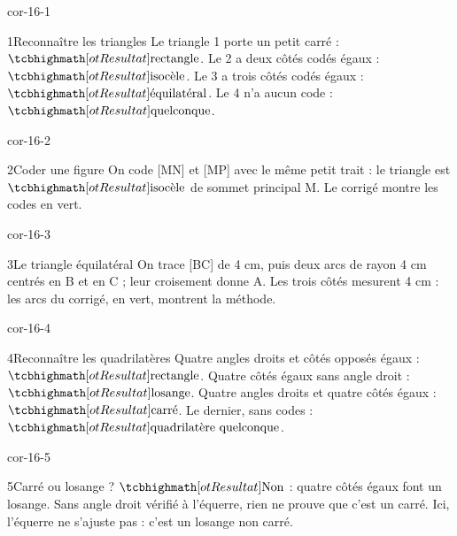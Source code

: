 \clearpage\pagestyle{otMain}\setlength{\otBlocEspacement}{2.5mm}\fontsize{11}{15}\selectfont{}
\begin{blocLivre}{cor-16-1}\begin{corrige}{1}{Reconnaître les triangles}
Le triangle 1 porte un petit carré : $\res{\text{rectangle}}$. Le 2 a deux côtés codés égaux : $\res{\text{isocèle}}$. Le 3 a trois côtés codés égaux : $\res{\text{équilatéral}}$. Le 4 n’a aucun code : $\res{\text{quelconque}}$.
\label{fig-cor-16-1}
\end{corrige}\end{blocLivre}
\begin{blocLivre}{cor-16-2}\begin{corrige}{2}{Coder une figure}
On code [MN] et [MP] avec le même petit trait : le triangle est $\res{\text{isocèle}}$ de sommet principal M. Le corrigé montre les codes en vert.
\label{fig-cor-16-2}
\end{corrige}\end{blocLivre}
\begin{blocLivre}{cor-16-3}\begin{corrige}{3}{Le triangle équilatéral}
On trace [BC] de 4 cm, puis deux arcs de rayon 4 cm centrés en B et en C ; leur croisement donne A. Les trois côtés mesurent 4 cm : les arcs du corrigé, en vert, montrent la méthode.
\label{fig-cor-16-3}
\end{corrige}\end{blocLivre}
\begin{blocLivre}{cor-16-4}\begin{corrige}{4}{Reconnaître les quadrilatères}
Quatre angles droits et côtés opposés égaux : $\res{\text{rectangle}}$. Quatre côtés égaux sans angle droit : $\res{\text{losange}}$. Quatre angles droits et quatre côtés égaux : $\res{\text{carré}}$. Le dernier, sans codes : $\res{\text{quadrilatère quelconque}}$.
\label{fig-cor-16-4}
\end{corrige}\end{blocLivre}
\begin{blocLivre}{cor-16-5}\begin{corrige}{5}{Carré ou losange ?}
$\res{\text{Non}}$ : quatre côtés égaux font un losange. Sans angle droit vérifié à l’équerre, rien ne prouve que c’est un carré. Ici, l’équerre ne s’ajuste pas : c’est un losange non carré.
\label{fig-cor-16-5}
\end{corrige}\end{blocLivre}

